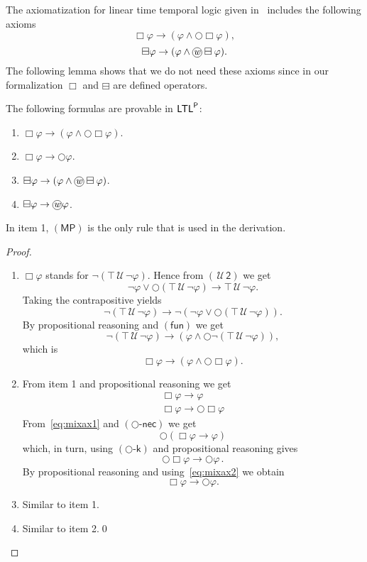 \documentclass[envcountsect,envcountsame,oribibl,orivec]{llncs}
\makeatletter
\newcommand{\todo}[1]{\marginpar{\textbf{TODO\footnotemark}}\@latex@warning{TODO: #1}\footnotetext{ #1}}
\newcommand*\circled[1]{\tikz[baseline=(char.base)]{
		\node[shape=circle,draw,inner sep=0.4pt] (char) {#1};}}
\newcommand{\mprule}{\ensuremath{(\textsf{MP})}}
\newcommand{\limplies}{\rightarrow}
\newcommand{\lnext}{\bigcirc}
\newcommand{\lalways}{\Box}
\newcommand{\lsofar}{\boxminus}
\newcommand{\luntil}{{\,\mathcal{U}\,}}
\newcommand{\wprevious}{\circled{\textit{w}}}
\newcommand{\kax}{\ensuremath{\textsf{-k}}}
\newcommand{\nextkax}{\ensuremath{(\lnext\kax)}}
\newcommand{\funax}{\ensuremath{(\textsf{fun})}}
\newcommand{\utwoax}{\ensuremath{(\luntil\textsf{2})}}
\newcommand{\necrule}{\ensuremath{\textsf{-nec}}}
\newcommand{\nextnecrule}{\ensuremath{(\lnext\necrule)}}
\newcommand{\LTL}{\textsf{LTL}}
\newcommand{\LTLp}{\LTL^{\sf P}}
\renewcommand{\phi}{\varphi}
\makeatother
\begin{document}
The axiomatization for linear time temporal logic given in~\cite{Gabbay,Gol87,Gor99,KrogerMerz2008} includes the following axioms 
\[
\lalways \phi \to (\phi \land \lnext \lalways \phi),
\]
\[
\lsofar \phi \to (\phi \wedge \wprevious \lsofar \phi).
\]
The following lemma shows that we do not need these axioms since in our formalization $\lalways$ and $\lsofar$ are defined operators. 

\begin{lemma}\label{lem:mix:1}
The following formulas are provable in $\LTLp$:

\begin{enumerate}
	\item $\lalways \phi \to (\phi \land \lnext \lalways \phi)$.
	\item $\lalways \phi \to  \lnext \phi$.
	\item $\lsofar \phi \to (\phi \wedge \wprevious \lsofar \phi)$.
	\item $\lsofar \phi \to  \wprevious \phi$.
\end{enumerate}

In item 1, $\mprule$ is the only rule that is used in the derivation.
\end{lemma}
\begin{proof}
\begin{enumerate}
	\item 
$\lalways \phi$ stands for $\lnot ( \top \luntil \lnot\phi)$.
Hence from $\utwoax$ we get
\[
  \lnot \phi \lor \lnext (\top \luntil \lnot \phi) \to \top \luntil \lnot \phi.
\]
Taking the contrapositive yields
\[
  \lnot ( \top \luntil \lnot \phi) \to \lnot (\lnot \phi \lor \lnext (\top \luntil \lnot \phi)).
\]
By propositional reasoning and $\funax$ we get
\[
 \lnot ( \top \luntil \lnot \phi) \to  (\phi \land \lnext \lnot (\top \luntil \lnot \phi)),
\]
which is
\[
  \lalways \phi \to (\phi \land \lnext \lalways \phi).
\]


\item From item 1 and propositional reasoning we get
\begin{align}
\lalways \phi \limplies \phi \label{eq:mixax1}\\
\lalways \phi \limplies \lnext\lalways \phi \label{eq:mixax2}
\end{align}
From~\eqref{eq:mixax1} and $\nextnecrule$ we get 
\[
\lnext(\lalways \phi \limplies \phi)
\]
which, in turn, using $\nextkax$ and propositional reasoning gives
\[
\lnext\lalways \phi \limplies \lnext \phi \, .
\]
By propositional reasoning and using~\eqref{eq:mixax2} we obtain 
\[
\lalways \phi \limplies \lnext \phi.
\]

\item Similar to item 1.

\item Similar to item 2.\qed
\end{enumerate}
\end{proof}
\end{document}
